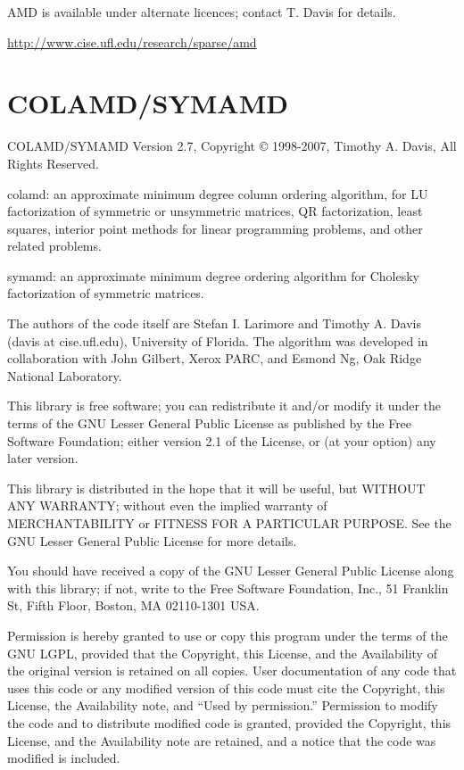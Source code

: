 AMD is available under alternate licences; contact T. Davis for
details.


\noindent
\url{http://www.cise.ufl.edu/research/sparse/amd}


\section{COLAMD/SYMAMD}

\noindent
COLAMD/SYMAMD Version 2.7, Copyright {\copyright} 1998-2007, Timothy A.
Davis, All Rights Reserved.


colamd: an approximate minimum degree column ordering algorithm, for
LU factorization of symmetric or unsymmetric matrices, QR factorization,
least squares, interior point methods for linear programming problems,
and other related problems.

symamd: an approximate minimum degree ordering algorithm for Cholesky
factorization of symmetric matrices.


The authors of the code itself are Stefan I. Larimore and Timothy A.
Davis (davis at cise.ufl.edu), University of Florida.  The algorithm
was developed in collaboration with John Gilbert, Xerox PARC, and
Esmond Ng, Oak Ridge National Laboratory.


This library is free software; you can redistribute it and/or
modify it under the terms of the GNU Lesser General Public License
as published by the Free Software Foundation; either version 2.1 of
the License, or (at your option) any later version.

This library is distributed in the hope that it will be useful,
but WITHOUT ANY WARRANTY; without even the implied warranty of
MERCHANTABILITY or FITNESS FOR A PARTICULAR PURPOSE.  See the GNU
Lesser General Public License for more details.

You should have received a copy of the GNU Lesser General Public
License along with this library; if not, write to the Free Software
Foundation, Inc., 51 Franklin St, Fifth Floor, Boston, MA 02110-1301
USA.

Permission is hereby granted to use or copy this program under the
terms of the GNU LGPL, provided that the Copyright, this License,
and the Availability of the original version is retained on all
copies.  User documentation of any code that uses this code or any
modified version of this code must cite the Copyright, this License,
the Availability note, and ``Used by permission.''  Permission to
modify the code and to distribute modified code is granted, provided
the Copyright, this License, and the Availability note are retained,
and a notice that the code was modified is included.

